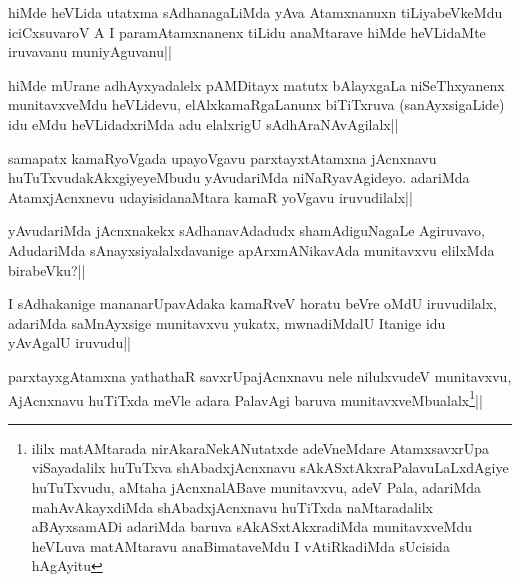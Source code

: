 
\begin{artha}
hiMde heVLida utatxma sAdhanagaLiMda yAva Atamxnanuxn tiLiyabeVkeMdu iciCxsuvaroV A I paramAtamxnanenx tiLidu anaMtarave hiMde heVLidaMte iruvavanu muniyAguvanu||
\end{artha}


\begin{artha}
hiMde mUrane adhAyxyadalelx pAMDitayx matutx bAlayxgaLa niSeThxyanenx munitavxveMdu heVLidevu, elAlxkamaRgaLanunx biTiTxruva (sanAyxsigaLide) idu eMdu heVLidadxriMda adu elalxrigU sAdhAraNAvAgilalx||
\end{artha}


\begin{artha}
samapatx kamaRyoVgada upayoVgavu parxtayxtAtamxna jAcnxnavu huTuTxvudakAkxgiyeyeMbudu yAvudariMda niNaRyavAgideyo. adariMda AtamxjAcnxnevu udayisidanaMtara kamaR yoVgavu iruvudilalx||
\end{artha}

\begin{artha}
yAvudariMda jAcnxnakekx sAdhanavAdadudx shamAdiguNagaLe Agiruvavo, AdudariMda sAnayxsiyalalxdavanige apArxmANikavAda munitavxvu elilxMda birabeVku?||
\end{artha}

\begin{artha}
I sAdhakanige mananarUpavAdaka kamaRveV horatu beVre oMdU iruvudilalx, adariMda saMnAyxsige munitavxvu yukatx, mwnadiMdalU Itanige idu yAvAgalU iruvudu||
\end{artha}


\begin{artha}
parxtayxgAtamxna yathathaR savxrUpajAcnxnavu nele nilulxvudeV munitavxvu, AjAcnxnavu huTiTxda meVle adara PalavAgi baruva munitavxveMbualalx\footnote{ililx matAMtarada nirAkaraNekANutatxde adeVneMdare AtamxsavxrUpa viSayadalilx huTuTxva shAbadxjAcnxnavu sAkASxtAkxraPalavuLaLxdAgiye huTuTxvudu, aMtaha jAcnxnalABave munitavxvu, adeV Pala, adariMda mahAvAkayxdiMda shAbadxjAcnxnavu huTiTxda naMtaradalilx aBAyxsamADi adariMda baruva sAkASxtAkxradiMda munitavxveMdu heVLuva matAMtaravu anaBimataveMdu I vAtiRkadiMda sUcisida hAgAyitu}||
\end{artha}

